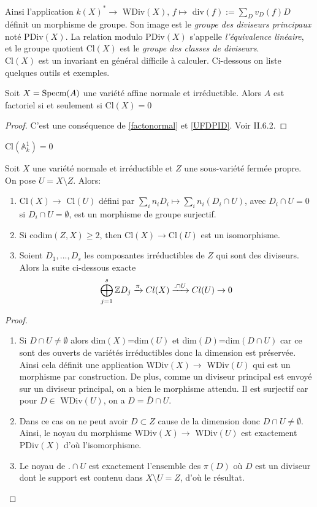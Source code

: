 Ainsi l'application $k(X)^*\rightarrow $ WDiv$(X),\, f\mapsto $ div$(f):=\sum_D v_D(f)D$ définit un morphisme de groupe. Son image est le \textit{groupe des diviseurs principaux} noté PDiv$(X)$. La relation modulo PDiv$(X)$ s'appelle \textit{l'équivalence linéaire}, et le groupe quotient Cl$(X)$ est le \textit{groupe des classes de diviseurs}.\\
Cl$(X)$ est un invariant en général difficile à calculer. Ci-dessous on liste quelques outils et exemples.


\begin{prop}
Soit $X=\operatorname{Specm}(A)$ une variété affine normale et irréductible. Alors $A$ est factoriel si et seulement si Cl$(X)=0$
\end{prop}
\begin{proof}
C'est une conséquence de \ref{factonormal} et \ref{UFDPID}. Voir \cite{Hartshorne} II.6.2.
\end{proof}

\begin{cor}
Cl$(\mathbb{A} ^1_k)=0$
\end{cor}

\begin{thm}
Soit $X$ une variété normale et irréductible et $Z$ une sous-variété fermée propre. On pose $U=X\setminus Z$. Alors:
\begin{enumerate}
\item Cl$(X)\rightarrow$ Cl$(U)$ défini par $\sum_i n_iD_i\mapsto \sum_i n_i(D_i\cap U)$, avec $D_i\cap U = 0$ si $D_i\cap U=\emptyset $, est un morphisme de groupe surjectif.
\item Si codim$(Z,X)\geq 2$, then Cl$(X)\rightarrow$Cl$(U)$ est un isomorphisme.
\item Soient $D_1,..., D_s$ les composantes irréductibles de $Z$ qui sont des diviseurs. Alors la suite ci-dessous exacte $$\bigoplus_{j=1}^s \mathbb{Z} D_j \xrightarrow{\pi} Cl(X) \xrightarrow{.\cap U} Cl(U) \rightarrow 0 $$
\end{enumerate}
\end{thm}
\begin{proof}
\begin{enumerate}
\item Si $D\cap U\neq \emptyset$ alors dim$(X)$=dim$(U)$ et dim$(D)$=dim$(D\cap U)$ car ce sont des ouverts de variétés irréductibles donc la dimension est préservée. Ainsi cela définit une application WDiv$(X)\rightarrow$ WDiv$(U)$ qui est un morphisme par construction. De plus, comme un diviseur principal est envoyé sur un diviseur principal, on a bien le morphisme attendu. Il est surjectif car pour $D\in$ WDiv$(U)$, on a $D=\overline{D}\cap U$.
\item Dans ce cas on ne peut avoir $D\subset Z$ cause de la dimension donc $D\cap U\neq \emptyset$. Ainsi, le noyau du morphisme WDiv$(X)\rightarrow$ WDiv$(U)$ est exactement PDiv$(X)$ d'où l'isomorphisme.
\item Le noyau de $.\cap U$ est exactement l'ensemble des $\pi(D)$ où $D$ est un diviseur dont le support est contenu dans $X\setminus U=Z$, d'où le résultat.
\end{enumerate}
\end{proof}

